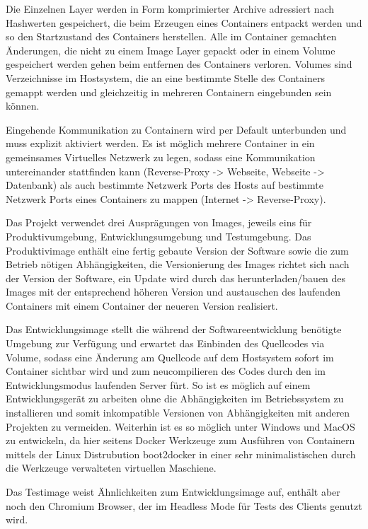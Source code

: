 Die Einzelnen Layer werden in Form komprimierter Archive adressiert nach
Hashwerten gespeichert, die beim Erzeugen eines Containers entpackt werden und
so den Startzustand des Containers herstellen. Alle im Container gemachten
\"{A}nderungen, die nicht zu einem Image Layer gepackt oder in einem Volume
gespeichert werden gehen beim entfernen des Containers verloren. Volumes sind
Verzeichnisse im Hostsystem, die an eine bestimmte Stelle des Containers gemappt
werden und gleichzeitig in mehreren Containern eingebunden sein k\"{o}nnen.

Eingehende Kommunikation zu Containern wird per Default unterbunden und muss
explizit aktiviert werden. Es ist m\"{o}glich mehrere Container in ein
gemeinsames Virtuelles Netzwerk zu legen, sodass eine Kommunikation
untereinander stattfinden kann (Reverse-Proxy -> Webseite, Webseite ->
Datenbank) als auch bestimmte Netzwerk Ports des Hosts auf bestimmte Netzwerk
Ports eines Containers zu mappen (Internet -> Reverse-Proxy).

Das Projekt verwendet drei Auspr\"{a}gungen von Images, jeweils eins f\"{u}r
Produktivumgebung, Entwicklungsumgebung und Testumgebung. Das Produktivimage
enth\"{a}lt eine fertig gebaute Version der Software sowie die zum Betrieb
n\"{o}tigen Abh\"{a}ngigkeiten, die Versionierung des Images richtet sich nach
der Version der Software, ein Update wird durch das herunterladen/bauen des
Images mit der entsprechend h\"{o}heren Version und austauschen des laufenden
Containers mit einem Container der neueren Version realisiert.

Das Entwicklungsimage stellt die w\"{a}hrend der Softwareentwicklung
ben\"{o}tigte Umgebung zur Verf\"{u}gung und erwartet das Einbinden des
Quellcodes via Volume, sodass eine \"{A}nderung am Quellcode auf dem Hostsystem
sofort im Container sichtbar wird und zum neucompilieren des Codes durch den im
Entwicklungsmodus laufenden Server f\"{u}rt. So ist es m\"{o}glich auf einem
Entwicklungsger\"{a}t  zu arbeiten ohne die Abh\"{a}ngigkeiten im Betriebssystem
zu installieren und somit inkompatible Versionen von Abh\"{a}ngigkeiten mit
anderen Projekten zu vermeiden. Weiterhin ist es so m\"{o}glich unter Windows
und MacOS zu entwickeln, da hier seitens Docker Werkzeuge zum Ausf\"{u}hren von
Containern mittels der Linux Distrubution boot2docker in einer sehr
minimalistischen durch die Werkzeuge verwalteten virtuellen Maschiene.

Das Testimage weist \"{A}hnlichkeiten zum Entwicklungsimage auf, enth\"{a}lt
aber noch den Chromium Browser, der im Headless Mode f\"{u}r Tests des Clients
genutzt wird.

